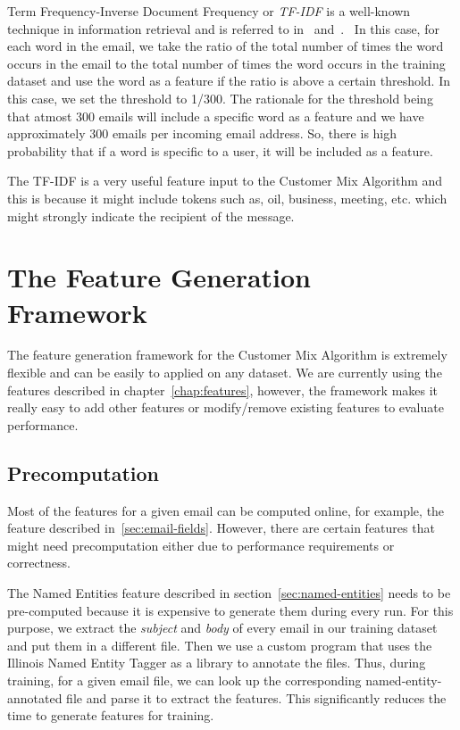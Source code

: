 \documentclass[senior,oneside]{UIUC}
\begin{document}
Term Frequency-Inverse Document Frequency or \emph{TF-IDF} is a well-known technique in information retrieval and is referred to in~\cite{idf} and~\cite{tf-idf}. \
In this case, for each word in the email, we take the ratio of the total number of times the word occurs in the email to the total number of times the word occurs in the training dataset and use the word as a feature if the ratio is above a certain threshold. In this case, we set the threshold to 1/300. The rationale for the threshold being that atmost 300 emails will include a specific word as a feature and we have approximately 300 emails per incoming email address. So, there is high probability that if a word is specific to a user, it will be included as a feature.

The TF-IDF is a very useful feature input to the Customer Mix Algorithm and this is because it might include tokens such as, oil, business, meeting, etc. which might strongly indicate the recipient of the message.


\chapter{The Feature Generation Framework}
\label{chap:feature-generation-framework}

The feature generation framework for the Customer Mix Algorithm is extremely flexible and can be easily to applied on any dataset. We are currently using the features described in chapter~\ref{chap:features}, however, the framework makes it really easy to add other features or modify/remove existing features to evaluate performance.

\section{Precomputation}

Most of the features for a given email can be computed online, for example, the feature described in~\ref{sec:email-fields}. However, there are certain features that might need precomputation either due to performance requirements or correctness.

The Named Entities feature described in section~\ref{sec:named-entities} needs to be pre-computed because it is expensive to generate them during every run. For this purpose, we extract the \emph{subject} and \emph{body} of every email in our training dataset and put them in a different file. Then we use a custom program that uses the Illinois Named Entity Tagger as a library to annotate the files. Thus, during training, for a given email file, we can look up the corresponding named-entity-annotated file and parse it to extract the features. This significantly reduces the time to generate features for training.
\end{document}
